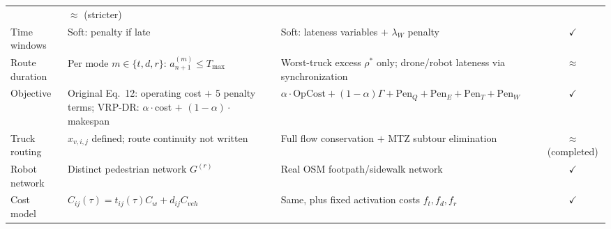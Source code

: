 \documentclass[10pt]{article}
\begin{document}
{\begin{longtable}{@{}p{}p{}p{}c@{}}
& $\approx$ (stricter) \\
Time windows & Soft: penalty if late & Soft: lateness variables $+$ $\lambda_W$ penalty & $\checkmark$ \\
Route duration & Per mode $m\in\{t,d,r\}$: $a^{(m)}_{n+1}\le T_{\max}$
& Worst-truck excess $\rho^*$ only; drone/robot lateness via synchronization
& $\approx$ \\
Objective & Original Eq.~12: operating cost $+$ 5 penalty terms; VRP-DR: $\alpha\cdot$cost $+$ $(1-\alpha)\cdot$makespan
& $\alpha\cdot\mathrm{OpCost}+(1-\alpha)\Gamma+\mathrm{Pen}_Q+\mathrm{Pen}_E+\mathrm{Pen}_T+\mathrm{Pen}_W$ & $\checkmark$ \\
Truck routing & $x_{v,i,j}$ defined; route continuity not written
& Full flow conservation $+$ MTZ subtour elimination & $\approx$ (completed) \\
Robot network & Distinct pedestrian network $G^{(r)}$ & Real OSM footpath/sidewalk network & $\checkmark$ \\
Cost model & $C_{ij}(\tau)=t_{ij}(\tau)C_w+d_{ij}C_{veh}$
& Same, plus fixed activation costs $f_t,f_d,f_r$ & $\checkmark$ \\
\bottomrule
\end{longtable}
}
\end{document}
